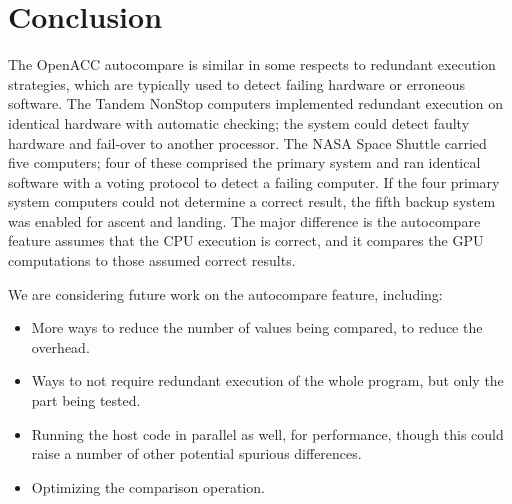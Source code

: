 \section{Conclusion}

The OpenACC autocompare is similar in some respects to redundant execution strategies, which are typically used to detect failing hardware or erroneous software.
The Tandem NonStop computers\cite{bartlett.tandem.86} implemented redundant execution on identical hardware with automatic checking; the system could detect faulty hardware and fail-over to another processor.
The NASA Space Shuttle carried five computers\cite{fraser.astro.74}; four of these comprised the primary system and ran identical software with a voting protocol to detect a failing computer.
If the four primary system computers could not determine a correct result, the fifth backup system was enabled for ascent and landing.
The major difference is the autocompare feature assumes that the CPU execution is correct, and it compares the GPU computations to those assumed correct results.

We are considering future work on the autocompare feature, including:
\begin{itemize}
\item More ways to reduce the number of values being compared, to reduce the overhead.
\item Ways to not require redundant execution of the whole program, but only the part being tested.
\item Running the host code in parallel as well, for performance, though this could raise a number of other potential spurious differences.
\item Optimizing the comparison operation.
\end{itemize}
